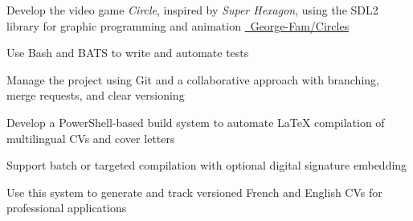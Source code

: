 \documentclass[letterpaper,10pt]{article}
\begin{document}
  \begin{resume_list}
    \item Develop the video game \textit{Circle}, inspired by \textit{Super Hexagon}, using the SDL2 library for graphic programming and animation {\small \href{https://github.com/George-Fam/Circles}{\faGithubSquare\ George-Fam/Circles}}
    \vspace{2pt}
    \item Use Bash and BATS to write and automate tests
    \vspace{2pt}
    \item Manage the project using Git and a collaborative approach with branching, merge requests, and clear versioning
  \end{resume_list}
  
  \begin{resume_list}
  \item Develop a PowerShell-based build system to automate LaTeX compilation of multilingual CVs and cover letters 
  \item Support batch or targeted compilation with optional digital signature embedding
  \item Use this system to generate and track versioned French and English CVs for professional applications
  \end{resume_list}
\end{document}
